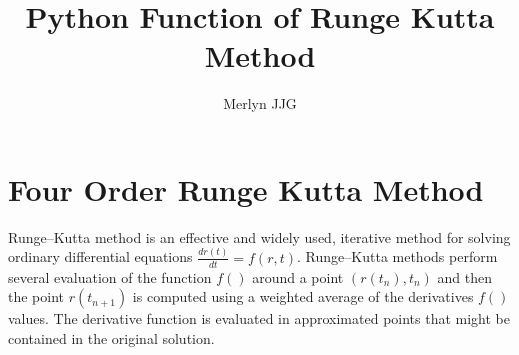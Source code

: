 \documentclass[12pt]{article}
\title{Python Function of Runge Kutta Method}
\author{Merlyn JJG}
\begin{document}
\maketitle

\section{Four Order Runge Kutta Method }
\label{sec:rk4}

Runge–Kutta method is an effective and widely used, iterative method
for solving ordinary differential equations
\(\frac{dr(t)}{dt}=f(r,t)\). Runge–Kutta methods perform several
evaluation of the function \(f()\) around a point \((r(t_{n}),t_{n})\)
and then the point \(r(t_{n+1})\) is computed using a weighted average
of the derivatives \(f()\) values. The derivative function is
evaluated in approximated points that might be contained in the
original solution.
\end{document}
